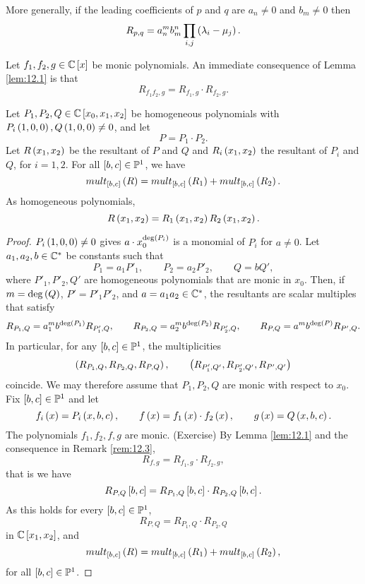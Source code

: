 \begin{remark}
More generally, if the leading coefficients of $ p $ and $ q $ are $ a_n \ne 0 $ and $ b_m \ne 0 $ then
$$ R_{p, q} = a_n^mb_m^n\prod_{i, j} \rb{\lambda_i - \mu_j}. $$
\end{remark}

\begin{remark}
\label{rem:12.3}
Let $ f_1, f_2, g \in \C\sb{x} $ be monic polynomials. An immediate consequence of Lemma \ref{lem:12.1} is that
$$ R_{f_1f_2, g} = R_{f_1, g} \cdot R_{f_2, g}. $$
\end{remark}

\begin{lemma}
\label{lem:12.4}
Let $ P_1, P_2, Q \in \C\sb{x_0, x_1, x_2} $ be homogeneous polynomials with $ P_i\rb{1, 0, 0}, Q\rb{1, 0, 0} \ne 0 $, and let
$$ P = P_1 \cdot P_2. $$
Let $ R\rb{x_1, x_2} $ be the resultant of $ P $ and $ Q $ and $ R_i\rb{x_1, x_2} $ the resultant of $ P_i $ and $ Q $, for $ i = 1, 2 $. For all $ \sb{b, c} \in \P^1 $, we have
$$ mult_{\sb{b, c}}\rb{R} = mult_{\sb{b, c}}\rb{R_1} + mult_{\sb{b, c}}\rb{R_2}. $$
As homogeneous polynomials,
$$ R\rb{x_1, x_2} = R_1\rb{x_1, x_2}R_2\rb{x_1, x_2}. $$
\end{lemma}

\begin{proof}
$ P_i\rb{1, 0, 0} \ne 0 $ gives $ a \cdot x_0^{\deg\rb{P_i}} $ is a monomial of $ P_i $ for $ a \ne 0 $. Let $ a_1, a_2, b \in \C^* $ be constants such that
$$ P_1 = a_1P'_1, \qquad P_2 = a_2P'_2, \qquad Q = bQ', $$
where $ P'_1, P'_2, Q' $ are homogeneous polynomials that are monic in $ x_0 $. Then, if $ m = \deg\rb{Q} $, $ P' = P'_1P'_2 $, and $ a = a_1a_2 \in \C^* $, the resultants are scalar multiples that satisfy
$$ R_{P_1, Q} = a_1^mb^{\deg\rb{P_1}}R_{P'_1, Q}, \qquad R_{P_2, Q} = a_2^mb^{\deg\rb{P_2}}R_{P'_2, Q}, \qquad R_{P, Q} = a^mb^{\deg\rb{P}}R_{P', Q}. $$
In particular, for any $ \sb{b, c} \in \P^1 $, the multiplicities
$$ \rb{R_{P_1, Q}, R_{P_2, Q}, R_{P, Q}}, \qquad \rb{R_{P'_1, Q'}, R_{P'_2, Q'}, R_{P', Q'}} $$
coincide. We may therefore assume that $ P_1, P_2, Q $ are monic with respect to $ x_0 $. Fix $ \sb{b, c} \in \P^1 $ and let
$$ f_i\rb{x} = P_i\rb{x, b, c}, \qquad f\rb{x} = f_1\rb{x} \cdot f_2\rb{x}, \qquad g\rb{x} = Q\rb{x, b, c}. $$
The polynomials $ f_1, f_2, f, g $ are monic. (Exercise) By Lemma \ref{lem:12.1} and the consequence in Remark \ref{rem:12.3},
$$ R_{f, g} = R_{f_1, g} \cdot R_{f_2, g}, $$
that is we have
$$ R_{P, Q}\sb{b, c} = R_{P_1, Q}\sb{b, c} \cdot R_{P_2, Q}\sb{b, c}. $$
As this holds for every $ \sb{b, c} \in \P^1 $,
$$ R_{P, Q} =  R_{P_1, Q} \cdot R_{P_2, Q} $$
in $ \C\sb{x_1, x_2} $, and
$$ mult_{\sb{b, c}}\rb{R} = mult_{\sb{b, c}}\rb{R_1} + mult_{\sb{b, c}}\rb{R_2}, $$
for all $ \sb{b, c} \in \P^1 $.
\end{proof}

